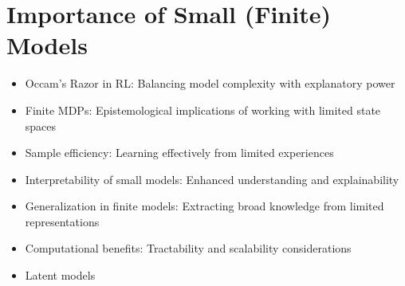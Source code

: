 \section{Importance of Small (Finite) Models}
\begin{itemize}
    \item Occam's Razor in RL: Balancing model complexity with explanatory power
    \item Finite MDPs: Epistemological implications of working with limited state spaces
    \item Sample efficiency: Learning effectively from limited experiences
    \item Interpretability of small models: Enhanced understanding and explainability
    \item Generalization in finite models: Extracting broad knowledge from limited representations
    \item Computational benefits: Tractability and scalability considerations
    \item Latent models
\end{itemize}

